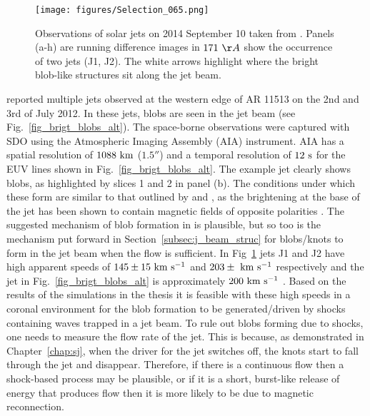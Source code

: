\begin{figure*}[h]
\begin{centering}
\texttt{[image: figures/Selection\_065.png]}
\caption{Observations of solar jets on  2014 September 10 taken from \cite{Zhang2016SoPh291859Z}. Panels (a-h) are running difference images in $171~\AA$ show the occurrence of two jets (J1, J2). The white arrows highlight where the bright blob-like structures sit along the jet beam.}
\label{fig_brigt_blobs_2} 
\end{centering}
\end{figure*}
%
\cite{Chen2015ApJ81571C, Chen2017ApJ84054C} reported multiple jets observed at the western edge of AR 11513 on the 2nd and 3rd of July 2012. In these jets, blobs are seen in the jet beam (see Fig.~\ref{fig_brigt_blobs_alt}). The space-borne observations were captured with SDO using the Atmospheric Imaging Assembly (AIA) instrument. AIA has a spatial resolution of $1088~\rm{km}$ ($\ang{;;1.5}$) and a temporal resolution of $12~\rm{s}$ for the EUV lines shown in Fig.~\ref{fig_brigt_blobs_alt}. The example jet clearly shows blobs, as highlighted by slices 1 and 2 in panel (b). The conditions under which these form are similar to that outlined by \cite{Zhang2014AA567A11Z} and \cite{Zhang2016SoPh291859Z}, as the brightening at the base of the jet has been shown to contain magnetic fields of opposite polarities \citep{Chen2017ApJ84054C}. \np
%
The suggested mechanism of blob formation in \cite{Zhang2016SoPh291859Z} is plausible, but so too is the mechanism put forward in Section~\ref{subsec:j_beam_struc} for blobs/knots to form in the jet beam when the flow is sufficient. In Fig~\ref{fig_brigt_blobs_2} jets J1 and J2 have high apparent speeds of $145\pm15~\rm{km ~s^{-1}}$ and $203\pm~\rm{km ~s^{-1}}$ respectively \citep{Zhang2016SoPh291859Z} and the jet in Fig.~\ref{fig_brigt_blobs_alt} is approximately $200~\rm{km ~s^{-1}}$ \citep{Chen2017ApJ84054C}. Based on the results of the simulations in the thesis it is feasible with these high speeds in a coronal environment for the blob formation to be generated/driven by shocks containing waves trapped in a jet beam. To rule out blobs forming due to shocks, one needs to measure the flow rate of the jet. This is because, as demonstrated in Chapter~\ref{chap:sj}, when the driver for the jet switches off, the knots start to fall through the jet and disappear. Therefore, if there is a continuous flow then a shock-based process may be plausible, or if it is a short, burst-like release of energy that produces flow then it is more likely to be due to magnetic reconnection.
